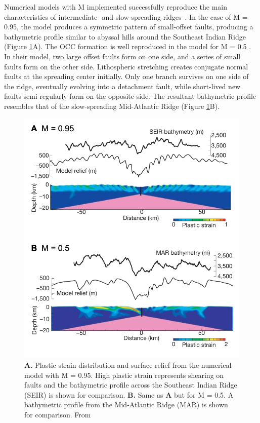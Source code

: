 \documentclass[letterpaper,12pt,notitle]{memphisthesis}                     %
\begin{document}
Numerical models with M implemented successfully reproduce the main characteristics of intermediate- and slow-spreading ridges~\citep{Buck2005}.
In the case of M = 0.95, the model produces a symmetric pattern of small-offset faults, producing a bathymetric profile similar to abyssal hills around the Southeast Indian Ridge (Figure \ref{fig:mfactor}A). 
The OCC formation is well reproduced in the model for M = 0.5 \citep{Buck2005}. In their model, two large offset faults form on one side, and a series of small faults form on the other side. Lithospheric stretching creates conjugate normal faults at the spreading center initially. Only one branch survives on one side of the ridge, eventually evolving into a detachment fault, while short-lived new faults semi-regularly form on the opposite side. The resultant bathymetric profile resembles that of the slow-spreading Mid-Atlantic Ridge (Figure \ref{fig:mfactor}B).
%
\begin{figure}[!htb]
	\centering
	\includegraphics[width=0.65\linewidth,trim=4 4 4 4,clip]{./figs/fig1.png}
	\caption{\textbf{A.} Plastic strain distribution and surface relief from the numerical model with M = 0.95. High plastic strain represents shearing on faults and the bathymetric profile across the Southeast Indian Ridge (SEIR) is shown for comparison. \textbf{B.} Same as \textbf{A} but for M = 0.5. A bathymetric profile from the Mid-Atlantic Ridge (MAR) is shown for comparison. From \citet{Buck2005}}
	\label{fig:mfactor}
\end{figure}

\end{document}

